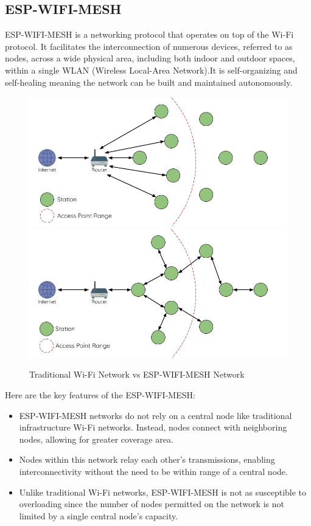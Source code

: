 \subsection{ESP-WIFI-MESH}
ESP-WIFI-MESH is a networking protocol that operates on top of the Wi-Fi protocol. It facilitates the interconnection of numerous devices, referred to as nodes, across a wide physical area, including both indoor and outdoor spaces, within a single WLAN (Wireless Local-Area Network).It is self-organizing and self-healing meaning the network can be built and maintained autonomously.

\begin{figure}[H]
     \includegraphics[width=0.5\linewidth]{Files/Images/traditional-network.png}
     \includegraphics[width=0.55\linewidth]{Files/Images/esp-wifi-mesh.png}
     \caption{Traditional Wi-Fi Network vs ESP-WIFI-MESH Network}
     \label{fig:enter-label}

\end{figure}

Here are the key features of the ESP-WIFI-MESH:
\begin{itemize}
    \item ESP-WIFI-MESH networks do not rely on a central node like traditional infrastructure Wi-Fi networks. Instead, nodes connect with neighboring nodes, allowing for greater coverage area.
    \item Nodes within this network relay each other's transmissions, enabling interconnectivity without the need to be within range of a central node.
    \item Unlike traditional Wi-Fi networks, ESP-WIFI-MESH is not as susceptible to overloading since the number of nodes permitted on the network is not limited by a single central node's capacity.
\end{itemize}